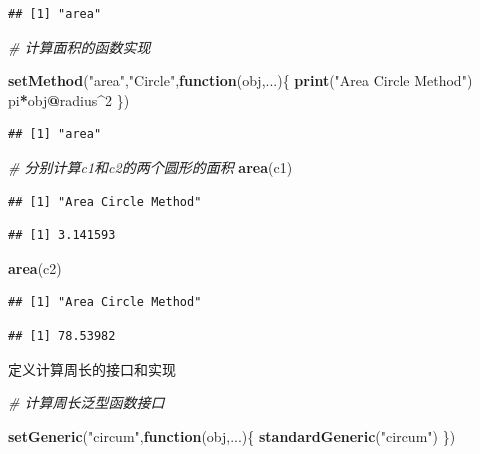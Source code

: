 \documentclass[]{book}
\newenvironment{Shaded}{\begin{snugshade}}{\end{snugshade}}
\newcommand{\KeywordTok}[1]{\textcolor[rgb]{0.13,0.29,0.53}{\textbf{#1}}}
\newcommand{\DecValTok}[1]{\textcolor[rgb]{0.00,0.00,0.81}{#1}}
\newcommand{\StringTok}[1]{\textcolor[rgb]{0.31,0.60,0.02}{#1}}
\newcommand{\CommentTok}[1]{\textcolor[rgb]{0.56,0.35,0.01}{\textit{#1}}}
\newcommand{\ControlFlowTok}[1]{\textcolor[rgb]{0.13,0.29,0.53}{\textbf{#1}}}
\newcommand{\OperatorTok}[1]{\textcolor[rgb]{0.81,0.36,0.00}{\textbf{#1}}}
\newcommand{\NormalTok}[1]{#1}
\begin{document}
\begin{verbatim}
## [1] "area"
\end{verbatim}

\begin{Shaded}
\begin{Highlighting}[]
\CommentTok{# 计算面积的函数实现}

\KeywordTok{setMethod}\NormalTok{(}\StringTok{"area"}\NormalTok{,}\StringTok{"Circle"}\NormalTok{,}\ControlFlowTok{function}\NormalTok{(obj,...)\{}
  \KeywordTok{print}\NormalTok{(}\StringTok{"Area Circle Method"}\NormalTok{)}
\NormalTok{  pi}\OperatorTok{*}\NormalTok{obj}\OperatorTok{@}\NormalTok{radius}\OperatorTok{^}\DecValTok{2}
\NormalTok{\})}
\end{Highlighting}
\end{Shaded}

\begin{verbatim}
## [1] "area"
\end{verbatim}

\begin{Shaded}
\begin{Highlighting}[]
\CommentTok{# 分别计算c1和c2的两个圆形的面积}
\KeywordTok{area}\NormalTok{(c1)}
\end{Highlighting}
\end{Shaded}

\begin{verbatim}
## [1] "Area Circle Method"
\end{verbatim}

\begin{verbatim}
## [1] 3.141593
\end{verbatim}

\begin{Shaded}
\begin{Highlighting}[]
\KeywordTok{area}\NormalTok{(c2)}
\end{Highlighting}
\end{Shaded}

\begin{verbatim}
## [1] "Area Circle Method"
\end{verbatim}

\begin{verbatim}
## [1] 78.53982
\end{verbatim}

定义计算周长的接口和实现

\begin{Shaded}
\begin{Highlighting}[]
\CommentTok{# 计算周长泛型函数接口}

\KeywordTok{setGeneric}\NormalTok{(}\StringTok{"circum"}\NormalTok{,}\ControlFlowTok{function}\NormalTok{(obj,...)\{}
  \KeywordTok{standardGeneric}\NormalTok{(}\StringTok{"circum"}\NormalTok{)}
\NormalTok{\})}
\end{Highlighting}
\end{Shaded}
\end{document}
